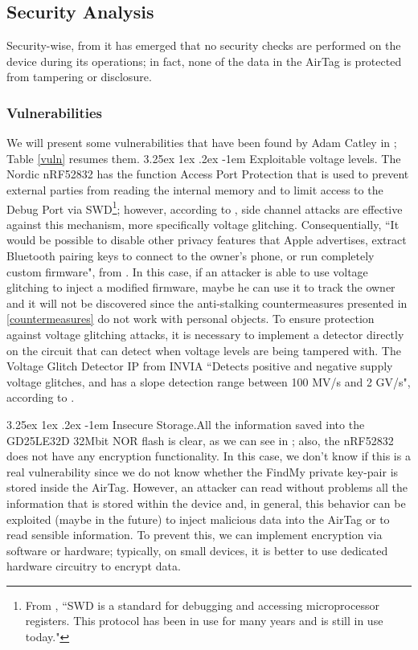 \documentclass[english]{article}
\makeatletter
\renewcommand\paragraph{\@startsection{paragraph}{5}{\z@}%
  {3.25ex \@plus1ex \@minus.2ex}%
  {-1em}%
  {\normalfont\normalsize\bfseries}}
\makeatother
\begin{document}
\subsection{Security Analysis}\label{sec}
Security-wise, from \cite{reverse} it has emerged that no security checks are performed on the device during its operations; in fact, none of the data in the AirTag is protected from tampering or disclosure.
\subsubsection{Vulnerabilities}\label{sec:vuln}
We will present some vulnerabilities that have been found by Adam Catley in \cite{reverse}; Table \ref{vuln} resumes them.
\paragraph{Exploitable voltage levels.}
The Nordic nRF52832 has the function Access Port Protection \cite{nordicsemi} that is used to prevent external parties from reading the internal memory and to limit access to the Debug Port via SWD\footnote{From \cite{Oberli_2019}, ``SWD is a standard for debugging and accessing microprocessor registers. This protocol has been in use for many years and is still in use today."}; however, according to \cite{side}, side channel attacks are effective against this mechanism, more specifically voltage glitching. Consequentially, ``It would be possible to disable other privacy features that Apple advertises, extract Bluetooth pairing keys to connect to the owner’s phone, or run completely custom firmware", from \cite{reverse}. In this case, if an attacker is able to use voltage glitching to inject a modified firmware, maybe he can use it to track the owner and it will not be discovered since the anti-stalking countermeasures presented in \ref{countermeasures} do not work with personal objects. 
To ensure protection against voltage glitching attacks, it is necessary to implement a detector directly on the circuit that can detect when voltage levels are being tampered with. The Voltage Glitch Detector IP from INVIA ``Detects positive and negative supply voltage glitches, and has a slope detection range between 100 MV/s and 2 GV/s", according to \cite{voltage}.

\paragraph{Insecure Storage.}All the information saved into the GD25LE32D 32Mbit NOR flash is clear, as we can see in \cite{tweet}; also, the nRF52832 does not have any encryption functionality. In this case, we don't know if this is a real vulnerability since we do not know whether the FindMy private key-pair is stored inside the AirTag. However, an attacker can read without problems all the information that is stored within the device and, in general, this behavior can be exploited (maybe in the future) to inject malicious data into the AirTag or to read sensible information. To prevent this, we can implement encryption via software or hardware; typically, on small devices, it is better to use dedicated hardware circuitry to encrypt data.
\end{document}
